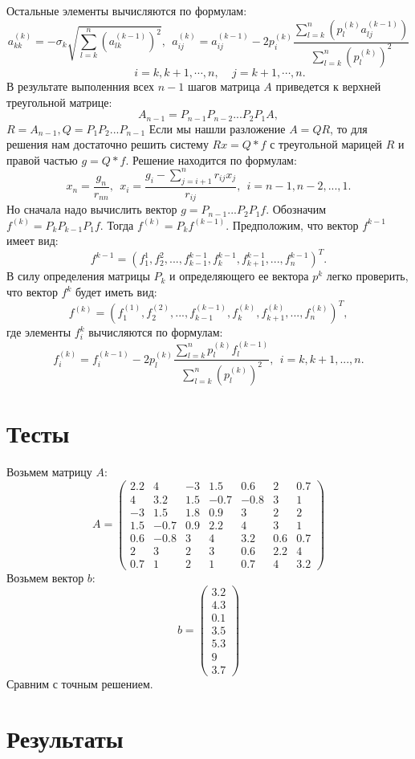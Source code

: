 \documentclass[14pt, titlepage,fleqn]{extarticle}
\begin{document}
	Остальные элементы вычисляются по формулам:
	\[a^{(k)}_{kk} = -\sigma_k \sqrt{\sum^{n}_{l=k}(a^{(k-1)}_{lk})^2}, ~~ a^{(k)}_{ij} = a^{(k-1)}_{ij} - 2p^{(k)}_{i} \dfrac{\sum^{n}_{l=k}(p^{(k)}_{l}a^{(k-1)}_{lj})}{\sum^{n}_{l=k}(p^{(k)}_{l})^2}\]
	\[~~~~~~~~~i = k, k+1, \cdots, n,~~~~~j=k+1,\cdots,n.\]
	\newpage
	В результате выполенния всех $n-1$ шагов матрица $A$ приведется к верхней треугольной матрице:
	\[A_{n-1} = P_{n-1}P_{n-2}...P_2P_1A,\]
	$R = A_{n-1}, Q = P_1P_2...P_{n-1}$
	Если мы нашли разложение $A = QR$, то для решения нам достаточно решить систему $Rx= Q*f$ с треугольной марицей $R$ и правой частью $g=Q*f$. Решение находится по формулам:
	\[x_n = \dfrac{g_n}{r_{nn}},~~ x_i = \dfrac{g_i - \sum^{n}_{j=i+1}r_{ij}x_j}{r_{ij}}, ~~i = n-1, n-2,...,1.\]
	Но сначала надо вычислить вектор $g = P_{n-1}...P_2P_1f.$ Обозначим $f^{(k)} = P_kP_{k-1}P_1f.$ Тогда $f^{(k)} = P_kf^{(k-1)}.$ Предположим, что вектор $f^{k-1}$ имеет вид:
	\[f^{k-1} = (f^{1}_{1}, f^{2}_{2},...,f^{k-1}_{k-1},f^{k-1}_{k},f^{k-1}_{k+1},...,f^{k-1}_{n})^T.\]
	В силу определения матрицы $P_k$ и определяющего ее вектора $p^k$ легко проверить, что вектор $f^k$ будет иметь вид:
	\[f^{(k)} = (f^{(1)}_{1}, f^{(2)}_{2}, ..., f^{(k-1)}_{k-1}, f^{(k)}_{k}, f^{(k)}_{k+1},...,f^{(k)}_{n})^T,\]
	где элементы $f^k_i$ вычисляются по формулам:
	\[f^{(k)}_{i} = f^{(k - 1)}_{i} - 2p^{(k)}_{l} \dfrac{\sum^{n}_{l=k}p^{(k)}_{l}f^{(k-1)}_{l}}{\sum^{n}_{l=k}(p^{(k)}_{l})^2},~~ i = k,k+1,...,n.\]
	\newpage
	\section*{Тесты}
	Возьмем матрицу $A$:
	\[A = \begin{pmatrix}
		2.2 & 4 & -3 & 1.5 & 0.6 & 2 & 0.7\\
        4 & 3.2 & 1.5 & -0.7 & -0.8 & 3 & 1\\
        -3 & 1.5 & 1.8 & 0.9 & 3 & 2 & 2\\
        1.5 & -0.7 & 0.9 & 2.2 & 4 & 3 & 1\\
        0.6 & -0.8 & 3 & 4 & 3.2 & 0.6 & 0.7\\
        2 & 3 & 2 & 3 & 0.6 & 2.2 & 4\\
        0.7 & 1 & 2 & 1 & 0.7 & 4 & 3.2
	\end{pmatrix}\]
	Возьмем вектор $b$:
	\[b =\begin{pmatrix}
		3.2\\
		4.3\\
		0.1\\
		3.5\\ 
		5.3\\ 
		9\\ 
		3.7
	\end{pmatrix} \]
	Сравним с точным решением.
\section*{Результаты}
\begin{figure}[H]
\end{figure}
\end{document}
